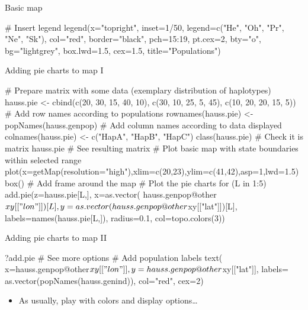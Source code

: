 \documentclass[compress, xelatex, 11pt, xcolor=svgnames, aspectratio=169,
	hyperref={
		bookmarks=true,
		unicode=true,
		colorlinks=true,
		pdftitle={Molecular data in R},
		plainpages=false,
		pdfauthor={Vojtech Zeisek},
		pdfsubject={Course about phylogeny and evolution in R},
		pdfcreator={XeLaTeX},
		pdfkeywords={R, evolution, phylogeny, molecular data},
		linkcolor=Crimson, %
		anchorcolor=Magenta, %
		citecolor=Magenta, %
		filecolor=Magenta, %
		menucolor=Magenta, %
		urlcolor=DodgerBlue, %
		},
	url={hyphens, lowtilde} %
	]{beamer}
\renewcommand{\texttt}[1]{\colorbox{Beige}{{\ttfamily #1}}}
\begin{document}
\begin{frame}[fragile]{Basic map}
	\begin{spluscode}
    # Insert legend
    legend(x="topright", inset=1/50, legend=c("He", "Oh", "Pr", "Ne", "Sk"),
      col="red", border="black", pch=15:19, pt.cex=2, bty="o", bg="lightgrey",
      box.lwd=1.5, cex=1.5, title="Populations")
	\end{spluscode}
	\begin{center}
		\texttt{[image: map.png]}
	\end{center}
\end{frame}

\begin{frame}[fragile]{Adding pie charts to map I}
	\begin{spluscode}
    # Prepare matrix with some data (exemplary distribution of haplotypes)
    hauss.pie <- cbind(c(20, 30, 15, 40, 10), c(30, 10, 25, 5, 45),
      c(10, 20, 20, 15, 5))
    # Add row names according to populations
    rownames(hauss.pie) <- popNames(hauss.genpop)
    # Add column names according to data displayed
    colnames(hauss.pie) <- c("HapA", "HapB", "HapC")
    class(hauss.pie) # Check it is matrix
    hauss.pie # See resulting matrix
    # Plot basic map with state boundaries within selected range
    plot(x=getMap(resolution="high"),xlim=c(20,23),ylim=c(41,42),asp=1,lwd=1.5)
    box() # Add frame around the map
    # Plot the pie charts
    for (L in 1:5) { add.pie(z=hauss.pie[L,], x=as.vector(
      hauss.genpop@other$xy[["lon"]])[L], y=as.vector(
      hauss.genpop@other$xy[["lat"]])[L], labels=names(hauss.pie[L,]),
      radius=0.1, col=topo.colors(3)) }
	\end{spluscode}
\end{frame}

\begin{frame}[fragile]{Adding pie charts to map II}
	\begin{multicols}{2}
		\begin{spluscode}
    ?add.pie # See more options
    # Add population labels
    text(
      x=hauss.genpop@other$xy[["lon"]],
      y=hauss.genpop@other$xy[["lat"]],
      labels=
      as.vector(popNames(hauss.genind)),
      col="red", cex=2)
		\end{spluscode}
		\begin{itemize}
			\item As usually, play with colors and display options\ldots
		\end{itemize}
		\begin{center}
			\texttt{[image: map\_pie.png]}
		\end{center}
	\end{multicols}
\end{frame}
\end{document}
